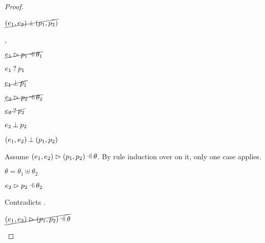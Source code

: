 \begin{proof}
\begin{byCases}
\begin{byCases}
\begin{byCases}
\begin{byCases}
            \end{byCases}
            \begin{pfsteps*}
            \item $\cancel{(e_1 , e_2) \mathbin{\bot} (p_1 , p_2)}$ 
            \end{pfsteps*}
        \item[\hmaymatch{e_1}{p_1},\hnotmatch{e_2}{p_2}]
            \begin{pfsteps*}
            \item $\cancel{\hpatmatch{e_1}{p_1}{\theta_1}}$  
            \item $e_1 \mathbin{?} p_1$  
            \item $\cancel{e_1 \mathbin{\bot} p_1}$  
            \item $\cancel{\hpatmatch{e_2}{p_2}{\theta_2}}$  
            \item $\cancel{e_2 \mathbin{?} p_2}$  
            \item $e_2 \mathbin{\bot} p_2$  
            \item $(e_1 , e_2) \mathbin{\bot} (p_1 , p_2)$ 
            \end{pfsteps*}
            Assume $\hpatmatch{\hpair{e_1}{e_2}}{\hpair{p_1}{p_2}}{\theta}$. By rule induction over  on it, only one case applies.
            \begin{byCases}
            \item[\text{(\ref{rule:MPair})}]
                \begin{pfsteps*}
                \item $\theta=\theta_1\uplus\theta_2$
                \item $\hpatmatch{e_2}{p_2}{\theta_2}$ 
                \end{pfsteps*}
                Contradicts .
            \end{byCases}
            \begin{pfsteps*}
            \item $\cancel{\hpatmatch{\hpair{e_1}{e_2}}{\hpair{p_1}{p_2}}{\theta}}$ 
            \end{pfsteps*}

\end{byCases}
\end{byCases}
\end{byCases}
\end{proof}
